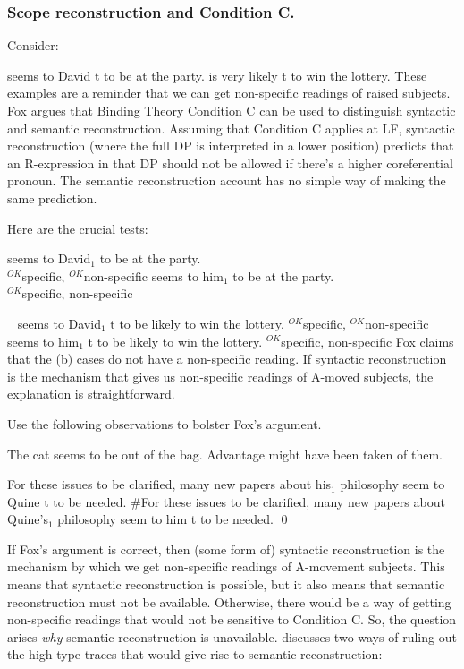 \clearpage
\subsubsection{Scope reconstruction and Condition C.}

Consider:

\pex
\a{} seems to David t to be at the party.
\a{} is very likely t to win the lottery.
\xe
%
These examples are a reminder that we can get non-specific readings of raised
subjects. Fox argues that Binding Theory Condition C can be used to distinguish
syntactic and semantic reconstruction. Assuming that Condition C applies at LF,
syntactic reconstruction (where the full DP is interpreted in a lower position)
predicts that an R-expression in that DP should not be allowed if there's a
higher coreferential pronoun. The semantic reconstruction account has no simple
way of making the same prediction.

Here are the crucial tests:

\pex
\a{} seems to David$_1$ to be at the party.\\
\hfill $^{OK}$specific, $^{OK}$non-specific 
\a{} seems to him$_{1}$ to be at the party.\\
\hfill $^{OK}$specific, {\small *}non-specific
\xe

\pex~
\a{} seems to David$_1$ t to be likely to win the
lottery.
\hfill $^{OK}$specific, $^{OK}$non-specific
\a{} seems to him$_1$ t to be likely to win the
lottery.
\hfill $^{OK}$specific, {\small *}non-specific
\xe
%
Fox claims that the (b) cases do not have a non-specific reading. If syntactic
reconstruction is the mechanism that gives us non-specific readings of A-moved
subjects, the explanation is straightforward.

\begin{exercise}
  Use the following observations to bolster Fox's argument.

  \pex
  \a The cat seems to be out of the bag.
  \a Advantage might have been taken of them.
  \xe

  \pex
  \a For these issues to be clarified, many new papers about his$_1$ philosophy
  seem to Quine t to be needed.
  \a \#For these issues to be clarified, many new papers about Quine's$_1$ philosophy
  seem to him t to be needed. \hfill\qed
  \xe 
\end{exercise}
%
If Fox's argument is correct, then (some form of) syntactic reconstruction is
the mechanism by which we get non-specific readings of A-movement subjects. This
means that syntactic reconstruction is possible, but it also means that semantic
reconstruction must not be available. Otherwise, there would be a way of getting
non-specific readings that would not be sensitive to Condition C. So, the
question arises \emph{why} semantic reconstruction is unavailable. \citet[p.
171, fn. 41]{fox-2000-book} discusses two ways of ruling out the high type traces
that would give rise to semantic reconstruction:

